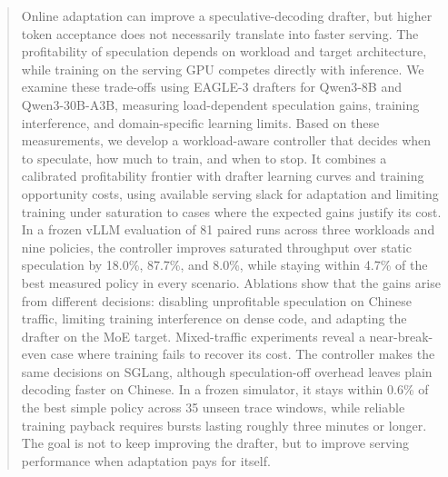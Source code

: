 \documentclass{article}
\begin{document}

\printAffiliationsAndNotice{}

\begin{abstract}
Online adaptation can improve a speculative-decoding drafter, but higher token acceptance does not necessarily translate into faster serving. The profitability of speculation depends on workload and target architecture, while training on the serving GPU competes directly with inference. We examine these trade-offs using EAGLE-3 drafters for Qwen3-8B and Qwen3-30B-A3B, measuring load-dependent speculation gains, training interference, and domain-specific learning limits. Based on these measurements, we develop a workload-aware controller that decides when to speculate, how much to train, and when to stop. It combines a calibrated profitability frontier with drafter learning curves and training opportunity costs, using available serving slack for adaptation and limiting training under saturation to cases where the expected gains justify its cost. In a frozen vLLM evaluation of 81 paired runs across three workloads and nine policies, the controller improves saturated throughput over static speculation by 18.0\%, 87.7\%, and 8.0\%, while staying within 4.7\% of the best measured policy in every scenario. Ablations show that the gains arise from different decisions: disabling unprofitable speculation on Chinese traffic, limiting training interference on dense code, and adapting the drafter on the MoE target. Mixed-traffic experiments reveal a near-break-even case where training fails to recover its cost. The controller makes the same decisions on SGLang, although speculation-off overhead leaves plain decoding faster on Chinese. In a frozen simulator, it stays within 0.6\% of the best simple policy across 35 unseen trace windows, while reliable training payback requires bursts lasting roughly three minutes or longer. The goal is not to keep improving the drafter, but to improve serving performance when adaptation pays for itself.
\end{abstract}
\end{document}
